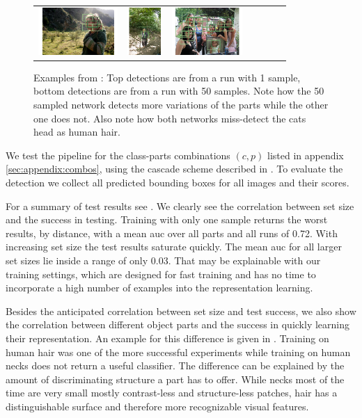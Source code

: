 \begin{figure}[htb]
\begin{tabular}{ccccccc}
      \includegraphics[height=1.8cm]{figures/hm_examples/50s_bbox_2009_005222} &
      \includegraphics[height=1.8cm]{figures/hm_examples/50s_bbox_2009_002715} &
      \includegraphics[height=1.8cm]{figures/hm_examples/50s_bbox_2010_005967}

    \end{tabular}
	\caption{Examples from : Top detections are from a run with 1 sample, bottom detections are from a run with 50 samples. Note how the 50 sampled network detects more variations of the parts while the other one does not. Also note how both networks miss-detect the cats head as human hair.}
  \label{fig:hm_examples}
\end{figure}
We test the pipeline for the class-parts combinations $(c,p)$ listed in appendix \ref{sec:appendix:combos}, using the cascade scheme described in . To evaluate the detection we collect all predicted bounding boxes for all images and their scores.

For a summary of test results see . We clearly see the correlation between set size and the success in testing. Training with only one sample returns the worst results, by distance, with a mean \gls{auc} over all parts and all runs of 0.72. With increasing set size the test results saturate quickly. The mean \gls{auc} for all larger set sizes lie inside a range of only 0.03. That may be explainable with our training settings, which are designed for fast training and has no time to incorporate a high number of examples into the representation learning.

Besides the anticipated correlation between set size and test success, we also show the correlation between different object parts and the success in quickly learning their representation. An example for this difference is given in . Training on human hair was one of the more successful experiments while training on human necks does not return a useful classifier. The difference can be explained by the amount of discriminating structure a part has to offer. While necks most of the time are very small mostly contrast-less and structure-less patches, hair has a distinguishable surface and therefore more recognizable visual features.

